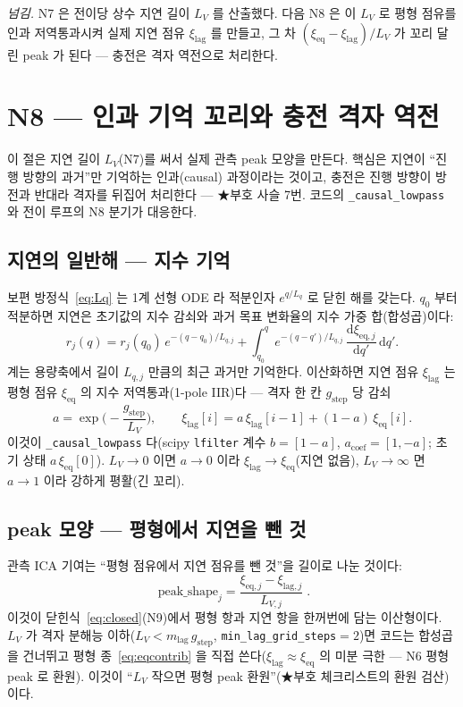 \documentclass[11pt,a4paper]{article}
\newcommand{\dd}{\mathrm{d}}
\newcommand{\eq}{\mathrm{eq}}
\newcommand{\lag}{\mathrm{lag}}
\newcommand{\code}[1]{\texttt{#1}}
\begin{document}
\medskip
\emph{넘김.} N7 은 전이당 상수 지연 길이 $L_V$ 를 산출했다. 다음 N8 은 이 $L_V$ 로 평형 점유를 인과 저역통과시켜 실제 지연 점유 $\xi_\lag$ 를 만들고, 그 차 $(\xi_\eq-\xi_\lag)/L_V$ 가 꼬리 달린 peak 가 된다 — 충전은 격자 역전으로 처리한다.

\section{N8 — 인과 기억 꼬리와 충전 격자 역전}\label{sec:memory}
이 절은 지연 길이 $L_V$(N7)를 써서 실제 관측 peak 모양을 만든다. 핵심은 지연이 ``진행 방향의 과거''만 기억하는 인과(causal) 과정이라는 것이고, 충전은 진행 방향이 방전과 반대라 격자를 뒤집어 처리한다 — ★부호 사슬 7번. 코드의 \code{\_causal\_lowpass} 와 전이 루프의 N8 분기가 대응한다.

\subsection{지연의 일반해 — 지수 기억}
보편 방정식~\eqref{eq:Lq} 는 1계 선형 ODE 라 적분인자 $e^{q/L_q}$ 로 닫힌 해를 갖는다. $q_0$ 부터 적분하면 지연은 초기값의 지수 감쇠와 과거 목표 변화율의 지수 가중 합(합성곱)이다:
\begin{equation}
r_j(q)=r_j(q_0)\,e^{-(q-q_0)/L_{q,j}}+\int_{q_0}^{q}e^{-(q-q')/L_{q,j}}\,\frac{\dd\xi_{\eq,j}}{\dd q'}\,\dd q'.
\label{eq:memory}
\end{equation}
계는 용량축에서 길이 $L_{q,j}$ 만큼의 최근 과거만 기억한다. 이산화하면 지연 점유 $\xi_\lag$ 는 평형 점유 $\xi_\eq$ 의 지수 저역통과(1-pole IIR)다 — 격자 한 칸 $g_\mathrm{step}$ 당 감쇠
\begin{equation}
a=\exp\!\Big(-\frac{g_\mathrm{step}}{L_V}\Big),\qquad
\xi_\lag[i]=a\,\xi_\lag[i-1]+(1-a)\,\xi_\eq[i].
\label{eq:lowpass}
\end{equation}
이것이 \code{\_causal\_lowpass} 다(scipy \code{lfilter} 계수 $b=[1-a]$, $a_\mathrm{coef}=[1,-a]$; 초기 상태 $a\,\xi_\eq[0]$). $L_V\to0$ 이면 $a\to0$ 이라 $\xi_\lag\to\xi_\eq$(지연 없음), $L_V\to\infty$ 면 $a\to1$ 이라 강하게 평활(긴 꼬리).

\subsection{peak 모양 — 평형에서 지연을 뺀 것}
관측 ICA 기여는 ``평형 점유에서 지연 점유를 뺀 것''을 길이로 나눈 것이다:
\begin{equation}
\boxed{\;\text{peak\_shape}_j=\frac{\xi_{\eq,j}-\xi_{\lag,j}}{L_{V,j}}\;.}
\label{eq:peakshape}
\end{equation}
이것이 닫힌식~\eqref{eq:closed}(N9)에서 평형 항과 지연 항을 한꺼번에 담는 이산형이다. $L_V$ 가 격자 분해능 이하($L_V<m_\lag\,g_\mathrm{step}$, \code{min\_lag\_grid\_steps}$=2$)면 코드는 합성곱을 건너뛰고 평형 종~\eqref{eq:eqcontrib} 을 직접 쓴다($\xi_\lag\approx\xi_\eq$ 의 미분 극한 — N6 평형 peak 로 환원). 이것이 ``$L_V$ 작으면 평형 peak 환원''(★부호 체크리스트의 환원 검산)이다.
\end{document}
